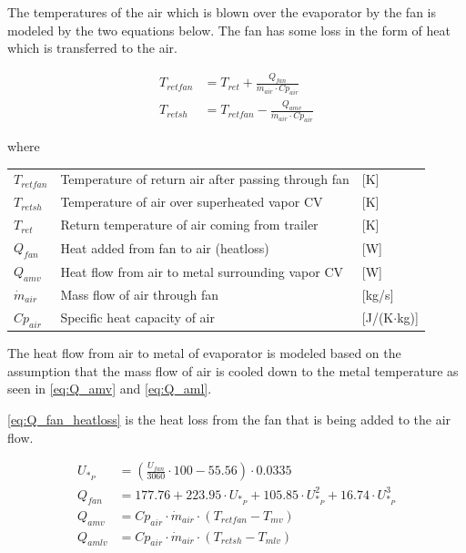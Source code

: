 \medskip
The temperatures of the air which is blown over the evaporator by the fan is modeled by the two equations below. The fan has some loss in the form of heat which is transferred to the air.

\begin{align}
	T_{retfan} 		& = T_{ret} + \frac{Q_{fan}}{\dot{m}_{air} \cdot Cp_{air}} 		\label{eq:T_retfan} 		\\
	T_{retsh} 		& = T_{retfan} - \frac{Q_{amv}}{\dot{m}_{air} \cdot Cp_{air}} 	\label{eq:T_retsh}
\end{align}

where

\begin{center}
	\begin{tabular}{l p{10cm} l}
		$T_{retfan}$    & Temperature of return air after passing through fan & [\si{K}]                          \\
		$T_{retsh}$     & Temperature of air over superheated vapor CV        & [\si{K}]                          \\
		$T_{ret}$       & Return temperature of air coming from trailer       & [\si{K}]                          \\
		$Q_{fan}$       & Heat added from fan to air (heatloss)               & [\si{W}]                          \\
		$Q_{amv}$       & Heat flow from air to metal surrounding vapor CV    & [\si{W}]                          \\
		$\dot{m}_{air}$ & Mass flow of air through fan                        & [\si{kg}/\si{s}]                  \\
		$Cp_{air}$      & Specific heat capacity of air                       & [\si{J}/(\si{K}$ \cdot $\si{kg})]
	\end{tabular}
\end{center}

\medskip
The heat flow from air to metal of evaporator is modeled based on the assumption that the mass flow of air is cooled down to the metal temperature as seen in \cref{eq:Q_amv} and \cref{eq:Q_aml}.

\cref{eq:Q_fan_heatloss} is the heat loss from the fan that is being added to the air flow.

\begin{align}
	U_{*_P} & = \left( \frac{U_{fan}}{3060}\cdot 100 - 55.56 \right) \cdot 0.0335                                         \\
	Q_{fan} & = 177.76 + 223.95 \cdot U_{*_P} + 105.85 \cdot U_{*_P}^2 + 16.74 \cdot U_{*_P}^3	\label{eq:Q_fan_heatloss} \\
	Q_{amv} & = Cp_{air} \cdot \dot{m}_{air} \cdot (T_{retfan} - T_{mv}) 	\label{eq:Q_amv}                                \\
	Q_{amlv} & = Cp_{air} \cdot \dot{m}_{air} \cdot (T_{retsh} - T_{mlv}) 	\label{eq:Q_aml}
\end{align}

